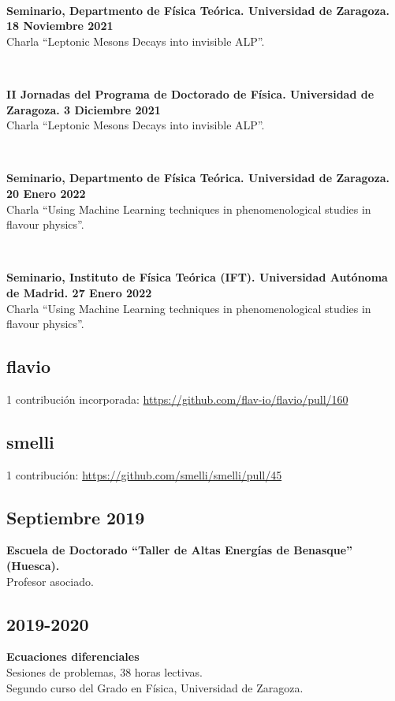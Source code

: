 \documentclass[combined.tex]{subfiles}
\begin{document}
~

\textbf{Seminario, Departmento de Física Teórica. Universidad de Zaragoza. 18 Noviembre 2021}\\
Charla ``Leptonic Mesons Decays into invisible ALP''.

~

\textbf{II Jornadas del Programa de Doctorado de Física. Universidad de Zaragoza. 3 Diciembre 2021}\\
Charla ``Leptonic Mesons Decays into invisible ALP''.

~

\textbf{Seminario, Departmento de Física Teórica. Universidad de Zaragoza. 20 Enero 2022}\\
Charla ``Using Machine Learning techniques in phenomenological studies in flavour physics''.

~

\textbf{Seminario, Instituto de Física Teórica (IFT). Universidad Autónoma de Madrid. 27 Enero 2022}\\
Charla ``Using Machine Learning techniques in phenomenological studies in flavour physics''.


\subsection{flavio}
1 contribución incorporada: \url{https://github.com/flav-io/flavio/pull/160}

\subsection{smelli}
1 contribución: \url{https://github.com/smelli/smelli/pull/45}


\subsection{Septiembre 2019}
\hspace{\parindent}\textbf{Escuela de Doctorado ``Taller de Altas Energías de Benasque'' (Huesca).}\\
Profesor asociado.

\subsection{2019-2020}
\hspace{\parindent}\textbf{Ecuaciones diferenciales}\\
Sesiones de problemas, 38 horas lectivas.\\
Segundo curso del Grado en Física, Universidad de Zaragoza.
\end{document}
